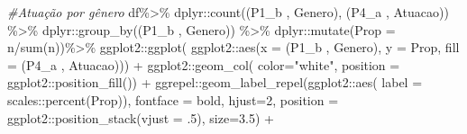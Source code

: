 \documentclass[
]{article}
\newenvironment{Shaded}{\begin{snugshade}}{\end{snugshade}}
\newcommand{\AttributeTok}[1]{\textcolor[rgb]{0.77,0.63,0.00}{#1}}
\newcommand{\CommentTok}[1]{\textcolor[rgb]{0.56,0.35,0.01}{\textit{#1}}}
\newcommand{\DecValTok}[1]{\textcolor[rgb]{0.00,0.00,0.81}{#1}}
\newcommand{\FloatTok}[1]{\textcolor[rgb]{0.00,0.00,0.81}{#1}}
\newcommand{\FunctionTok}[1]{\textcolor[rgb]{0.00,0.00,0.00}{#1}}
\newcommand{\NormalTok}[1]{#1}
\newcommand{\SpecialCharTok}[1]{\textcolor[rgb]{0.00,0.00,0.00}{#1}}
\newcommand{\StringTok}[1]{\textcolor[rgb]{0.31,0.60,0.02}{#1}}
\begin{document}
\begin{Shaded}
\begin{Highlighting}[]
\CommentTok{\#Atuação por gênero}
\NormalTok{df}\SpecialCharTok{\%\textgreater{}\%}
\NormalTok{  dplyr}\SpecialCharTok{::}\FunctionTok{count}\NormalTok{(}\StringTok{\textasciigrave{}}\AttributeTok{(\textquotesingle{}P1\_b \textquotesingle{}, \textquotesingle{}Genero\textquotesingle{})}\StringTok{\textasciigrave{}}\NormalTok{, }\StringTok{\textasciigrave{}}\AttributeTok{(\textquotesingle{}P4\_a \textquotesingle{}, \textquotesingle{}Atuacao\textquotesingle{})}\StringTok{\textasciigrave{}}\NormalTok{) }\SpecialCharTok{\%\textgreater{}\%}
\NormalTok{  dplyr}\SpecialCharTok{::}\FunctionTok{group\_by}\NormalTok{(}\StringTok{\textasciigrave{}}\AttributeTok{(\textquotesingle{}P1\_b \textquotesingle{}, \textquotesingle{}Genero\textquotesingle{})}\StringTok{\textasciigrave{}}\NormalTok{) }\SpecialCharTok{\%\textgreater{}\%}
\NormalTok{  dplyr}\SpecialCharTok{::}\FunctionTok{mutate}\NormalTok{(}\AttributeTok{Prop =}\NormalTok{ n}\SpecialCharTok{/}\FunctionTok{sum}\NormalTok{(n))}\SpecialCharTok{\%\textgreater{}\%}
\NormalTok{  ggplot2}\SpecialCharTok{::}\FunctionTok{ggplot}\NormalTok{(}
\NormalTok{    ggplot2}\SpecialCharTok{::}\FunctionTok{aes}\NormalTok{(}\AttributeTok{x =} \StringTok{\textasciigrave{}}\AttributeTok{(\textquotesingle{}P1\_b \textquotesingle{}, \textquotesingle{}Genero\textquotesingle{})}\StringTok{\textasciigrave{}}\NormalTok{, }\AttributeTok{y =}\NormalTok{ Prop,}
                 \AttributeTok{fill =} \StringTok{\textasciigrave{}}\AttributeTok{(\textquotesingle{}P4\_a \textquotesingle{}, \textquotesingle{}Atuacao\textquotesingle{})}\StringTok{\textasciigrave{}}\NormalTok{)) }\SpecialCharTok{+}
\NormalTok{  ggplot2}\SpecialCharTok{::}\FunctionTok{geom\_col}\NormalTok{( }\AttributeTok{color=}\StringTok{"white"}\NormalTok{,}
                     \AttributeTok{position =}\NormalTok{ ggplot2}\SpecialCharTok{::}\FunctionTok{position\_fill}\NormalTok{()) }\SpecialCharTok{+}
\NormalTok{  ggrepel}\SpecialCharTok{::}\FunctionTok{geom\_label\_repel}\NormalTok{(ggplot2}\SpecialCharTok{::}\FunctionTok{aes}\NormalTok{(}
    \AttributeTok{label =}\NormalTok{ scales}\SpecialCharTok{::}\FunctionTok{percent}\NormalTok{(Prop)),}
    \AttributeTok{fontface =} \StringTok{\textquotesingle{}bold\textquotesingle{}}\NormalTok{,}
    \AttributeTok{hjust=}\DecValTok{2}\NormalTok{,}
    \AttributeTok{position =}\NormalTok{ ggplot2}\SpecialCharTok{::}\FunctionTok{position\_stack}\NormalTok{(}\AttributeTok{vjust =}\NormalTok{ .}\DecValTok{5}\NormalTok{),}
    \AttributeTok{size=}\FloatTok{3.5}\NormalTok{) }\SpecialCharTok{+}

\end{Highlighting}
\end{Shaded}
\end{document}
